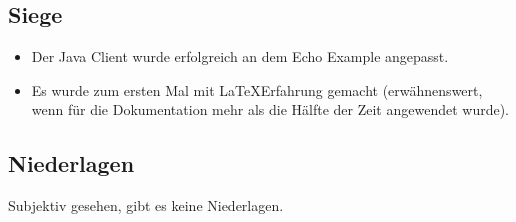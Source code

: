 \documentclass[11pt]{article}
\begin{document}
\subsection{Siege}
\begin{itemize}
\item Der Java Client wurde erfolgreich an dem Echo Example angepasst.
\item Es wurde zum ersten Mal mit \LaTeX  Erfahrung gemacht (erwähnenswert, wenn für die Dokumentation mehr als die Hälfte der Zeit angewendet wurde).
\end{itemize}
\subsection{Niederlagen}
Subjektiv gesehen, gibt es keine Niederlagen.

{}

\end{document}
